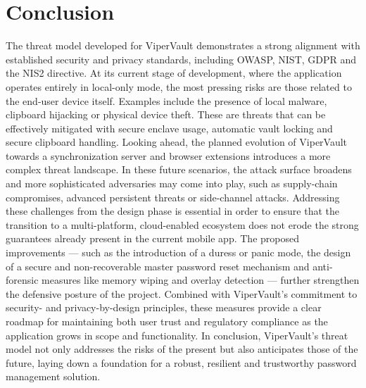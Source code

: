 \section{Conclusion}
	The threat model developed for ViperVault demonstrates a strong alignment with established security and privacy standards, including OWASP, NIST, GDPR and the NIS2 directive.
	At its current stage of development, where the application operates entirely in local-only mode, the most pressing risks are those related to the end-user device itself.
	Examples include the presence of local malware, clipboard hijacking or physical device theft.
	These are threats that can be effectively mitigated with secure enclave usage, automatic vault locking and secure clipboard handling.
	Looking ahead, the planned evolution of ViperVault towards a synchronization server and browser extensions introduces a more complex threat landscape.
	In these future scenarios, the attack surface broadens and more sophisticated adversaries may come into play, such as supply-chain compromises, advanced persistent threats or side-channel attacks.
	Addressing these challenges from the design phase is essential in order to ensure that the transition to a multi-platform, cloud-enabled ecosystem does not erode the strong guarantees already present in the current mobile app.
	The proposed improvements --- such as the introduction of a duress or panic mode, the design of a secure and non-recoverable master password reset mechanism and anti-forensic measures like memory wiping and overlay detection --- further strengthen the defensive posture of the project.
	Combined with ViperVault’s commitment to security- and privacy-by-design principles, these measures provide a clear roadmap for maintaining both user trust and regulatory compliance as the application grows in scope and functionality.
	In conclusion, ViperVault’s threat model not only addresses the risks of the present but also anticipates those of the future, laying down a foundation for a robust, resilient and trustworthy password management solution.